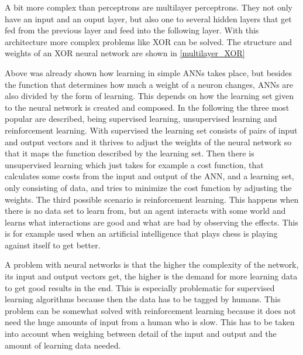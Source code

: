 A bit more complex than perceptrons are multilayer perceptrons. They not only have an input and an ouput layer, but also one to several hidden layers that get fed from the previous layer and feed into the following layer. With this architecture more complex problems like XOR can be solved. The structure and weights of an XOR neural network are shown in \autoref{multilayer_XOR}

Above was already shown how learning in simple ANNs takes place, but besides the function that determines how much a weight of a neuron changes, ANNs are also divided by the form of learning. This depends on how the learning set given to the neural network is created and composed. In the following the three most popular are described, being supervised learning, unsupervised learning and reinforcement learning. With supervised the learning set consists of pairs of input and output vectors and it thrives to adjust the weights of the neural network so that it maps the function described by the learning set. Then there is unsupervised learning which just takes for example a cost function, that calculates some costs from the input and output of the ANN, and a learning set, only consisting of data, and tries to minimize the cost function by adjusting the weights. The third possible scenario is reinforcement learning. This happens when there is no data set to learn from, but an agent interacts with some world and learns what interactions are good and what are bad by observing the effects. This is for example used when an artificial intelligence that plays chess is playing against itself to get better.

A problem with neural networks is that the higher the complexity of the network, its input and output vectors get, the higher is the demand for more learning data to get good results in the end. This is especially problematic for supervised learning algorithms because then the data has to be tagged by humans. This problem can be somewhat solved with reinforcement learning because it does not need the huge amounts of input from a human who is slow. This has to be taken into account when weighing between detail of the input and output and the amount of learning data needed.